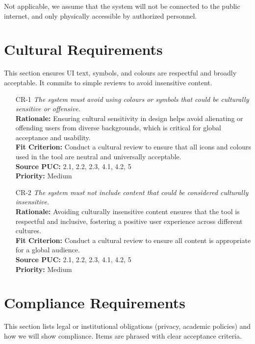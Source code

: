 \documentclass[12pt]{article}
\begin{document}
Not applicable, we assume that the system will not be connected to the public
internet, and only physically accessible by authorized personnel.

\section{Cultural Requirements}
This section ensures UI text, symbols, and colours are respectful and broadly acceptable.
It commits to simple reviews to avoid insensitive content.
\begin{itemize}[leftmargin=*]
  \item[CR-1] \emph{The system must avoid using colours or symbols that could be
          culturally sensitive or offensive.}\\[2mm]
        \textbf{Rationale:} Ensuring cultural sensitivity in design helps avoid alienating or offending users from diverse backgrounds, which is critical for global acceptance and usability.\\
        \textbf{Fit Criterion:} Conduct a cultural review to ensure that all icons and colours used in the tool are neutral and universally acceptable.\\
        \textbf{Source PUC:} 2.1, 2.2, 2.3, 4.1, 4.2, 5 \\
        \textbf{Priority:} Medium

  \item[CR-2] \emph{The system must not include content that could be considered
          culturally insensitive.}\\[2mm]
        \textbf{Rationale:} Avoiding culturally insensitive content ensures that the tool is respectful and inclusive, fostering a positive user experience across different cultures.\\
        \textbf{Fit Criterion:} Conduct a cultural review to ensure all content is appropriate for a global audience.\\
        \textbf{Source PUC:} 2.1, 2.2, 2.3, 4.1, 4.2, 5 \\
        \textbf{Priority:} Medium
\end{itemize}

\section{Compliance Requirements}
This section lists legal or institutional obligations (privacy, academic policies) and how we will show compliance.
Items are phrased with clear acceptance criteria.
\end{document}
